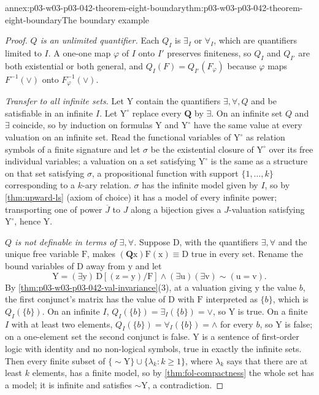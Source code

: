 \begin{annexitem}{annex:p03-w03-p03-042-theorem-eight-boundary}{thm:p03-w03-p03-042-theorem-eight-boundary}{The boundary example}
\begin{proof}
\emph{\(Q\) is an unlimited quantifier.}  Each \(Q_I\) is \(\exists_I\) or
\(\forall_I\), which are quantifiers limited to \(I\).  A one-one map
\(\varphi\) of \(I\) onto \(I'\) preserves finiteness, so \(Q_I\) and
\(Q_{I'}\) are both existential or both general, and
\(Q_I(F)=Q_{I'}(F_\varphi)\) because \(\varphi\) maps \(F^{-1}(\vee)\) onto
\(F_\varphi^{-1}(\vee)\).

\emph{Transfer to all infinite sets.}  Let \(\mathrm Y\) contain the
quantifiers \(\exists,\forall,Q\) and be satisfiable in an infinite \(I\).
Let \(\mathrm Y^\circ\) replace every \(\mathbf Q\) by \(\exists\).  On an
infinite set \(Q\) and \(\exists\) coincide, so by induction on formulas
\(\mathrm Y\) and \(\mathrm Y^\circ\) have the same value at every
valuation on an infinite set.  Read the functional variables of
\(\mathrm Y^\circ\) as relation symbols of a finite signature and let
\(\sigma\) be the existential closure of \(\mathrm Y^\circ\) over its free
individual variables; a valuation on a set satisfying \(\mathrm Y^\circ\)
is the same as a structure on that set satisfying \(\sigma\), a
propositional function with support \(\{1,\ldots,k\}\) corresponding to a
\(k\)-ary relation.  \(\sigma\) has the infinite model given by \(I\), so
by \cref{thm:upward-ls} (axiom of choice) it has a model of every infinite
power; transporting one of power \(\overline J\) to \(J\) along a bijection
gives a \(J\)-valuation satisfying \(\mathrm Y^\circ\), hence
\(\mathrm Y\).

\emph{\(Q\) is not definable in terms of \(\exists,\forall\).}  Suppose
\(\mathrm D\), with the quantifiers \(\exists,\forall\) and the unique free
variable \(\mathrm F\), makes \((\mathbf Q\mathrm x)\mathrm F(\mathrm x)
\equiv\mathrm D\) true in every set.  Rename the bound variables of
\(\mathrm D\) away from \(\mathrm y\) and let
\[
 \mathrm Y=(\exists\mathrm y)\,\mathrm D[(\mathrm z=\mathrm y)/\mathrm F]
 \wedge(\exists\mathrm u)(\exists\mathrm v){\sim}(\mathrm u=\mathrm v).
\]
By \cref{thm:p03-w03-p03-042-val-invariance}(3), at a valuation giving
\(\mathrm y\) the value \(b\), the first conjunct's matrix has the value of
\(\mathrm D\) with \(\mathrm F\) interpreted as \(\{b\}\), which is
\(Q_I(\{b\})\).  On an infinite \(I\), \(Q_I(\{b\})=\exists_I(\{b\})=\vee\),
so \(\mathrm Y\) is true.  On a finite \(I\) with at least two elements,
\(Q_I(\{b\})=\forall_I(\{b\})=\wedge\) for every \(b\), so \(\mathrm Y\) is
false; on a one-element set the second conjunct is false.  \(\mathrm Y\) is
a sentence of first-order logic with identity and no non-logical symbols,
true in exactly the infinite sets.  Then every finite subset of
\(\{{\sim}\mathrm Y\}\cup\{\lambda_k:k\geq1\}\), where \(\lambda_k\) says
that there are at least \(k\) elements, has a finite model, so by
\cref{thm:fol-compactness} the whole set has a model; it is infinite and
satisfies \({\sim}\mathrm Y\), a contradiction.
\end{proof}
\end{annexitem}

